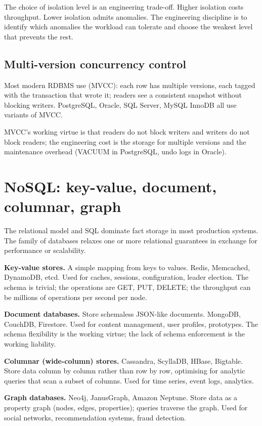 The choice of isolation level is an engineering trade-off. Higher isolation costs throughput. Lower isolation admits anomalies. The engineering discipline is to identify which anomalies the workload can tolerate and choose the weakest level that prevents the rest.

\subsection{Multi-version concurrency control}

Most modern RDBMS use  (MVCC): each row has multiple versions, each tagged with the transaction that wrote it; readers see a consistent snapshot without blocking writers. PostgreSQL, Oracle, SQL Server, MySQL InnoDB all use variants of MVCC.

MVCC's working virtue is that readers do not block writers and writers do not block readers; the engineering cost is the storage for multiple versions and the maintenance overhead (VACUUM in PostgreSQL, undo logs in Oracle).

\section{NoSQL: key-value, document, columnar, graph}

The relational model and SQL dominate fact storage in most production systems. The  family of databases relaxes one or more relational guarantees in exchange for performance or scalability.

\textbf{Key-value stores.} A simple mapping from keys to values. Redis, Memcached, DynamoDB, etcd. Used for caches, sessions, configuration, leader election. The schema is trivial; the operations are GET, PUT, DELETE; the throughput can be millions of operations per second per node.

\textbf{Document databases.} Store schemaless JSON-like documents. MongoDB, CouchDB, Firestore. Used for content management, user profiles, prototypes. The schema flexibility is the working virtue; the lack of schema enforcement is the working liability.

\textbf{Columnar (wide-column) stores.} Cassandra, ScyllaDB, HBase, Bigtable. Store data column by column rather than row by row, optimising for analytic queries that scan a subset of columns. Used for time series, event logs, analytics.

\textbf{Graph databases.} Neo4j, JanusGraph, Amazon Neptune. Store data as a property graph (nodes, edges, properties); queries traverse the graph. Used for social networks, recommendation systems, fraud detection.

